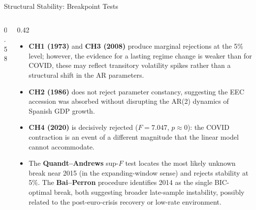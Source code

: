\documentclass[9pt]{beamer}
\begin{document}
\begin{frame}{Structural Stability: Breakpoint Tests}
\footnotesize

\begin{columns}
  \begin{column}{0.58\textwidth}
    {\fontsize{5.5}{6}\selectfont
    \setlength{\tabcolsep}{2.5pt}
    \setlength{\abovecaptionskip}{2pt}
    \setlength{\belowcaptionskip}{1pt}
    
    \vspace{0.1cm}
    
    }
  \end{column}

  \begin{column}{0.42\textwidth}
    \scriptsize
    \begin{itemize}
      \item \textbf{CH1 (1973)} and \textbf{CH3 (2008)} produce marginal rejections at the 5\% level; however, the evidence for a lasting regime change is weaker than for COVID, these may reflect transitory volatility spikes rather than a structural shift in the AR parameters.
      \item \textbf{CH2 (1986)} does not reject parameter constancy, suggesting the EEC accession was absorbed without disrupting the AR(2) dynamics of Spanish GDP growth.
      \item \textbf{CH4 (2020)} is decisively rejected ($F=7.047$, $p\approx 0$): the COVID contraction is an event of a different magnitude that the linear model cannot accommodate.
      \item The \textbf{Quandt--Andrews} sup-$F$ test locates the most likely unknown break near 2015 (in the expanding-window sense) and rejects stability at 5\%. The \textbf{Bai--Perron} procedure identifies 2014 as the single BIC-optimal break, both suggesting broader late-sample instability, possibly related to the post-euro-crisis recovery or low-rate environment.
    \end{itemize}
  \end{column}
\end{columns}

\end{frame}
\end{document}
